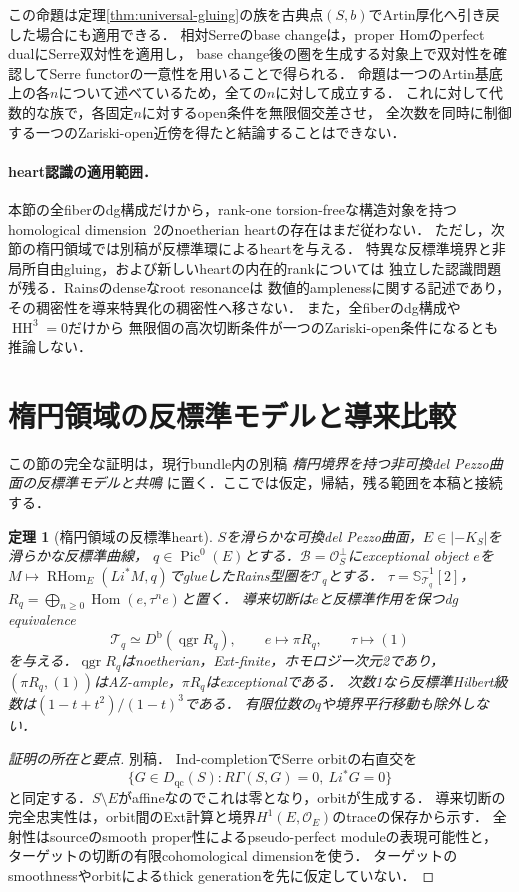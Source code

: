 \documentclass[11pt,a4paper]{ltjsarticle}
\newtheorem{theorem}{定理}[section]
\theoremstyle{definition}
\newcommand{\OO}{\mathcal O}
\newcommand{\BB}{\mathcal B}
\newcommand{\TT}{\mathcal T}
\newcommand{\SSer}{\mathbb S}
\newcommand{\Db}{D^{\mathrm b}}
\newcommand{\RHom}{\operatorname{RHom}}
\newcommand{\Hom}{\operatorname{Hom}}
\newcommand{\qgr}{\operatorname{qgr}}
\newcommand{\Pic}{\operatorname{Pic}}
\begin{document}
この命題は定理\ref{thm:universal-gluing}の族を古典点$(S,b)$でArtin厚化へ引き戻した場合にも適用できる．
相対Serreのbase changeは，proper Homのperfect dualにSerre双対性を適用し，
base change後の圏を生成する対象上で双対性を確認してSerre functorの一意性を用いることで得られる．
命題は一つのArtin基底上の各$n$について述べているため，全ての$n$に対して成立する．
これに対して代数的な族で，各固定$n$に対するopen条件を無限個交差させ，
全次数を同時に制御する一つのZariski-open近傍を得たと結論することはできない．

\paragraph{heart認識の適用範囲．}
本節の全fiberのdg構成だけから，rank-one torsion-freeな構造対象を持つ
homological dimension~2のnoetherian heartの存在はまだ従わない．
ただし，次節の楕円領域では別稿\cite{Resonance}が反標準環によるheartを与える．
特異な反標準境界と非局所自由gluing，および新しいheartの内在的rankについては
独立した認識問題が残る．Rains\cite[\S4]{RainsFiltered}のdenseなroot resonanceは
数値的amplenessに関する記述であり，その稠密性を導来特異化の稠密性へ移さない．
また，全fiberのdg構成や$\operatorname{HH}^3=0$だけから
無限個の高次切断条件が一つのZariski-open条件になるとも推論しない．

\section{楕円領域の反標準モデルと導来比較}\label{sec:elliptic-comparison}
この節の完全な証明は，現行bundle内の別稿
\emph{楕円境界を持つ非可換del Pezzo曲面の反標準モデルと共鳴}
\cite{Resonance}に置く．ここでは仮定，帰結，残る範囲を本稿と接続する．

\begin{theorem}[楕円領域の反標準heart]\label{thm:elliptic-comparison}
$S$を滑らかな可換del Pezzo曲面，$E\in|-K_S|$を滑らかな反標準曲線，
$q\in\Pic^0(E)$とする．$\BB=\OO_S^\perp$にexceptional object $e$を
$M\mapsto\RHom_E(Li^*M,q)$でglueしたRains型圏を$\TT_q$とする．
$\tau=\SSer_{\TT_q}^{-1}[2]$，$R_q=\bigoplus_{n\geq0}\Hom(e,\tau^ne)$と置く．
導来切断は$e$と反標準作用を保つdg equivalence
\[
 \TT_q\simeq\Db(\qgr R_q),\qquad e\mapsto\pi R_q,\qquad \tau\mapsto(1)
\]
を与える．$\qgr R_q$はnoetherian，Ext-finite，ホモロジー次元2であり，
$(\pi R_q,(1))$はAZ-ample，$\pi R_q$はexceptionalである．
次数1なら反標準Hilbert級数は$(1-t+t^2)/(1-t)^3$である．
有限位数の$q$や境界平行移動も除外しない．
\end{theorem}
\begin{proof}[証明の所在と要点]
別稿\cite[定理1.1，第3--4節]{Resonance}．
Ind-completionでSerre orbitの右直交を
\[
 \{G\in D_{\mathrm{qc}}(S):R\Gamma(S,G)=0,\ Li^*G=0\}
\]
と同定する．$S\setminus E$がaffineなのでこれは零となり，orbitが生成する．
導来切断の完全忠実性は，orbit間のExt計算と境界$H^1(E,\OO_E)$のtraceの保存から示す．
全射性はsourceのsmooth proper性によるpseudo-perfect moduleの表現可能性と，
ターゲットの切断の有限cohomological dimensionを使う．
ターゲットのsmoothnessやorbitによるthick generationを先に仮定していない．
\end{proof}
\end{document}
